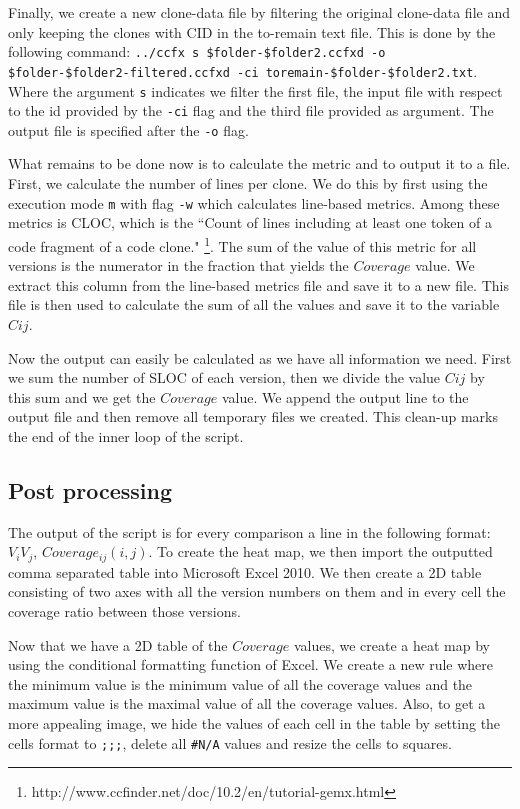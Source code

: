 \documentclass[a4paper,twoside, twocolumn, 11pt]{article}
\numberwithin{equation}{section}
\begin{document}
Finally, we create a new clone-data file by filtering the original clone-data file and only keeping the clones with CID in the to-remain text file.
This is done by the following command: \texttt{../ccfx s \$folder-\$folder2.ccfxd -o \$folder-\$folder2-filtered.ccfxd -ci toremain-\$folder-\$folder2.txt}.
Where the argument \texttt{s} indicates we filter the first file, the input file with respect to the id provided by the \texttt{-ci} flag and the third file provided as argument.
The output file is specified after the \texttt{-o} flag.

What remains to be done now is to calculate the metric and to output it to a file.
First, we calculate the number of lines per clone.
We do this by first using the execution mode \texttt{m} with flag \texttt{-w} which calculates line-based metrics.
Among these metrics is CLOC, which is the ``Count of lines including at least one token of a code fragment of a code clone." \footnote{http://www.ccfinder.net/doc/10.2/en/tutorial-gemx.html}.
The sum of the value of this metric for all versions is the numerator in the fraction that yields the $Coverage$ value.
We extract this column from the line-based metrics file and save it to a new file.
This file is then used to calculate the sum of all the values and save it to the variable $Cij$.

Now the output can easily be calculated as we have all information we need. 
First we sum the number of SLOC of each version, then we divide the value $Cij$ by this sum and we get the $Coverage$ value.
We append the output line to the output file and then remove all temporary files we created.
This clean-up marks the end of the inner loop of the script.

\subsection{Post processing}
The output of the script is for every comparison a line in the following format: $V_iV_j$, $Coverage_{ij}(i,j)$.
To create the heat map, we then import the outputted comma separated table into Microsoft Excel 2010.
We then create a 2D table consisting of two axes with all the version numbers on them and in every cell the coverage ratio between those versions.

Now that we have a 2D table of the $Coverage$ values, we create a heat map by using the conditional formatting function of Excel.
We create a new rule where the minimum value is the minimum value of all the coverage values and the maximum value is the maximal value of all the coverage values.
Also, to get a more appealing image, we hide the values of each cell in the table by setting the cells format to \texttt{;;;}, delete all \texttt{\#N/A} values and resize the cells to squares.
\end{document}
